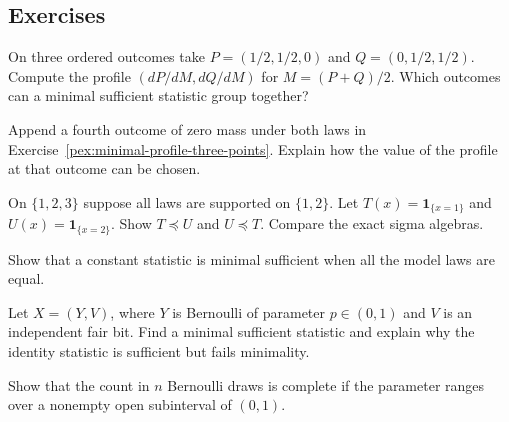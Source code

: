 \documentclass[11pt,oneside]{book}
\theoremstyle{definition}
\theoremstyle{remark}
\begin{document}
\subsection{Exercises}
\label{subsec:practice-4-4}

\begin{practiceexercise}
\label{pex:minimal-profile-three-points}
On three ordered outcomes take $P=(1/2,1/2,0)$ and $Q=(0,1/2,1/2)$.
Compute the profile $(dP/dM,dQ/dM)$ for $M=(P+Q)/2$.
Which outcomes can a minimal sufficient statistic group together?
\end{practiceexercise}

\begin{practiceexercise}
\label{pex:minimal-profile-null-outcome}
Append a fourth outcome of zero mass under both laws in
Exercise~\ref{pex:minimal-profile-three-points}.
Explain how the value of the profile at that outcome can be chosen.
\end{practiceexercise}

\begin{practiceexercise}
\label{pex:minimal-statistic-comparison}
On $\{1,2,3\}$ suppose all laws are supported on $\{1,2\}$.
Let $T(x)=\mathbf 1_{\{x=1\}}$ and $U(x)=\mathbf 1_{\{x=2\}}$.
Show $T\preceq U$ and $U\preceq T$. Compare the exact sigma algebras.
\end{practiceexercise}

\begin{practiceexercise}
\label{pex:minimal-one-law}
Show that a constant statistic is minimal sufficient when all
the model laws are equal.
\end{practiceexercise}

\begin{practiceexercise}
\label{pex:minimal-sufficient-extra-bit}
Let $X=(Y,V)$, where $Y$ is Bernoulli of parameter $p\in(0,1)$
and $V$ is an independent fair bit. Find a minimal sufficient
statistic and explain why the identity statistic is sufficient
but fails minimality.
\end{practiceexercise}

\begin{practiceexercise}
\label{pex:complete-bernoulli-subinterval}
Show that the count in $n$ Bernoulli draws is complete if the
parameter ranges over a nonempty open subinterval of $(0,1)$.
\end{practiceexercise}
\end{document}
